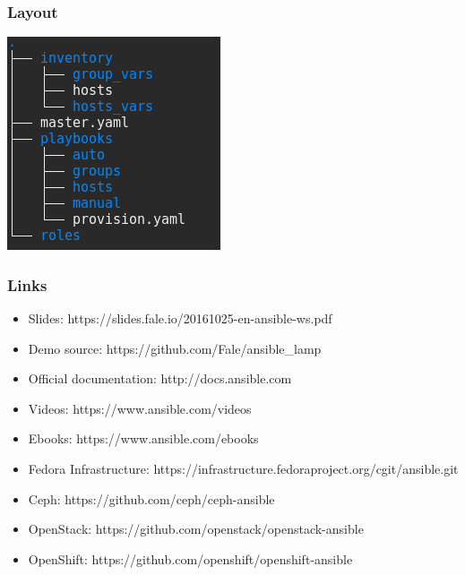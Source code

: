 \documentclass[t,aspectratio=169]{beamer}
\begin{document}
\begin{frame}
    \frametitle{Layout}
    \begin{center}
        \includegraphics[scale=0.5]{project_structure.png}
    \end{center}
\end{frame}

\begin{frame}
    \frametitle{Links}
    \begin{itemize}
        \item Slides: https://slides.fale.io/20161025-en-ansible-ws.pdf
        \item Demo source: https://github.com/Fale/ansible\_lamp
        \item Official documentation: http://docs.ansible.com
        \item Videos: https://www.ansible.com/videos
        \item Ebooks: https://www.ansible.com/ebooks
        \item Fedora Infrastructure: https://infrastructure.fedoraproject.org/cgit/ansible.git
        \item Ceph: https://github.com/ceph/ceph-ansible
        \item OpenStack: https://github.com/openstack/openstack-ansible
        \item OpenShift: https://github.com/openshift/openshift-ansible
    \end{itemize}
\end{frame}

\end{document}
